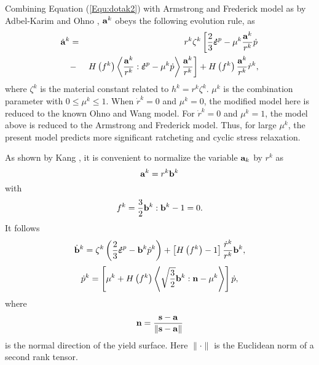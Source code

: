 \documentclass[preprint,5p,twocolumn,11pt,sort&compress]{elsarticle}
\newcommand{\dotbfepsilon}{{\mbox{\boldmath{$\dot\varepsilon$}}}}
\newcommand{\bfn}{{\bf n}}
\newcommand{\bfa}{{\bf a}}
\newcommand{\bfb}{{\bf b}}
\newcommand{\bfs}{{\bf s}}
\begin{document}
Combining Equation (\ref{Equ:dotak2}) with Armstrong and Frederick model as by Adbel-Karim and Ohno  \cite{AbdelKarim20051303},  ${\bfa^k}$ obeys the following evolution rule, as
\begin{eqnarray}
\label{Equ:dotak3}
{\dot\bfa^k} &=& {r^k}{\zeta ^k}\left[ \frac{2}{3}{{\dotbfepsilon}^p} - {\mu ^k}\frac{\bfa^k}{r^k}\dot p \right.
\\ \nonumber
&-& \left.  H\left( {f^k} \right) \left\langle {\frac{\bfa^k}{r^k}:{\dotbfepsilon}^p} - {\mu ^k}\dot p \right\rangle \frac{\bfa^k}{r^k} \right]
+ H\left( {f^k} \right)\frac{\bfa^k}{r^k}{\dot r^k},
\end{eqnarray}
where ${\zeta ^k}$ is the material constant related to ${h^k} = {r^k}{\zeta ^k}$. ${\mu ^k}$ is the combination parameter with $0 \leqslant {\mu ^k} \leqslant 1$. When ${\dot r^k} = 0$ and ${\mu ^k} = 0$, the modified model here is reduced to the known Ohno and Wang model. For ${\dot r^k} = 0$ and ${\mu ^k} = 1$, the  model above is reduced to the Armstrong and Frederick model. Thus, for large ${\mu ^k}$, the present model predicts more significant ratcheting and cyclic stress relaxation.


As shown by Kang \cite{Kang2004299}, it is convenient to normalize the variable $\bfa_k$ by $r^k$ as
\begin{equation}
\label{Equ:ak1}
{\bfa^k} = {r^k}{\bfb^k}
\end{equation}
with
\begin{equation}
{f^k} = \frac{3}{2}{\bfb^k}:{\bfb^k} - 1 = 0.
\end{equation}
It follows
\begin{equation}
{\dot\bfb^k} = {\zeta ^k}\left( {\frac{2}{3}{\dotbfepsilon^p} - {\bfb^k}{{\dot p}^k}} \right) + \left[ {H\left( {{f^k}} \right) - 1} \right]\frac{{{{\dot r}^k}}}{{{r^k}}}{\bfb^k},
\end{equation}
\begin{equation}
{\dot p^k} = \left[ {{\mu ^k} + H\left( {{f^k}} \right)\left\langle {\sqrt {\frac{3}{2}} {\bfb^k}:\bfn - {\mu ^k}} \right\rangle } \right]\dot p,
\end{equation}
where
\[\bfn = \frac{{\bfs - \bfa}}{{\left\| {\bfs - \bfa} \right\|}}
\]
is the normal direction of the yield surface. Here $\parallel\cdot\parallel$ is the Euclidean norm of a second rank tensor.
\end{document}
